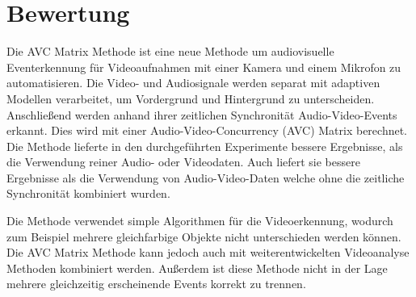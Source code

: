 \section{Bewertung} 

Die AVC Matrix Methode ist eine neue Methode um audiovisuelle Eventerkennung für Videoaufnahmen mit einer Kamera und einem Mikrofon zu automatisieren. Die Video- und Audiosignale werden separat mit adaptiven Modellen verarbeitet, um Vordergrund und Hintergrund zu unterscheiden. Anschließend werden anhand ihrer zeitlichen Synchronität Audio-Video-Events erkannt. Dies wird mit einer Audio-Video-Concurrency (AVC) Matrix berechnet. Die Methode lieferte in den durchgeführten Experimente bessere Ergebnisse, als die Verwendung reiner Audio- oder Videodaten. Auch liefert sie bessere Ergebnisse als die Verwendung von Audio-Video-Daten welche ohne die zeitliche Synchronität kombiniert wurden.

Die Methode verwendet simple Algorithmen für die Videoerkennung, wodurch zum Beispiel mehrere gleichfarbige Objekte nicht unterschieden werden können. Die AVC Matrix Methode kann jedoch auch mit weiterentwickelten Videoanalyse Methoden kombiniert werden. Außerdem ist diese Methode nicht in der Lage mehrere gleichzeitig erscheinende Events korrekt zu trennen.